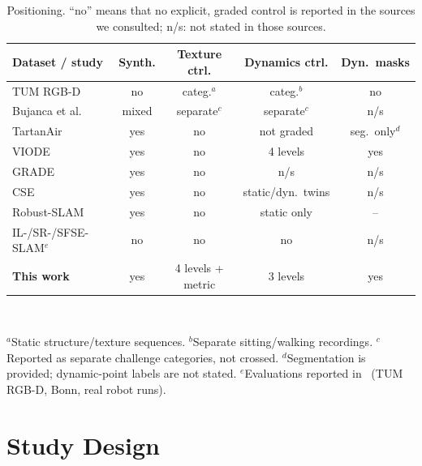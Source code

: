 \documentclass[conference]{IEEEtran}
\begin{document}
\begin{table}[t]
\caption{Positioning. ``no'' means that no explicit, graded control is reported in the sources we consulted; n/s: not stated in those sources.}
\label{tab:positioning}
\centering
\scriptsize
\setlength{\tabcolsep}{2.5pt}
\begin{tabular}{@{}lcccc@{}}
\toprule
Dataset / study & Synth. & Texture ctrl. & Dynamics ctrl. & Dyn.\ masks \\
\midrule
TUM RGB-D~\cite{sturm2012tum}            & no    & categ.$^{a}$ & categ.$^{b}$ & no \\
Bujanca et al.~\cite{bujanca2021robust}  & mixed & separate$^{c}$ & separate$^{c}$ & n/s \\
TartanAir~\cite{wang2020tartanair}       & yes   & no & not graded & seg.\ only$^{d}$ \\
VIODE~\cite{minoda2021viode}             & yes   & no & 4 levels & yes \\
GRADE~\cite{bonetto2023grade}            & yes   & no & n/s & n/s \\
CSE~\cite{park2024cse}                   & yes   & no & static/dyn.\ twins & n/s \\
Robust-SLAM~\cite{xu2024perturbation}    & yes   & no & static only & -- \\
IL-/SR-/SFSE-SLAM$^{e}$ & no & no & no & n/s \\
\midrule
\textbf{This work}                       & yes   & 4 levels + metric & 3 levels & yes \\
\bottomrule
\end{tabular}\\[2pt]
\parbox{\columnwidth}{\scriptsize $^{a}$Static structure/texture sequences. $^{b}$Separate sitting/walking recordings. $^{c}$Reported as separate challenge categories, not crossed. $^{d}$Segmentation is provided; dynamic-point labels are not stated. $^{e}$Evaluations reported in~\cite{zhang2025ilslam,zhang2025srslam,li2026sfse} (TUM RGB-D, Bonn, real robot runs).}
\end{table}

\section{Study Design}
\label{sec:design}
\end{document}
